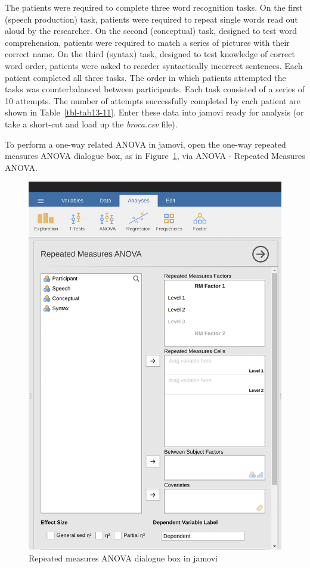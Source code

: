 \documentclass[
  a4paper,
]{book}
\begin{document}
The patients were required to complete three word recognition tasks. On
the first (speech production) task, patients were required to repeat
single words read out aloud by the researcher. On the second
(conceptual) task, designed to test word comprehension, patients were
required to match a series of pictures with their correct name. On the
third (syntax) task, designed to test knowledge of correct word order,
patients were asked to reorder syntactically incorrect sentences. Each
patient completed all three tasks. The order in which patients attempted
the tasks was counterbalanced between participants. Each task consisted
of a series of 10 attempts. The number of attempts successfully
completed by each patient are shown in Table~\ref{tbl-tab13-11}. Enter
these data into jamovi ready for analysis (or take a short-cut and load
up the \emph{broca.csv} file).

To perform a one-way related ANOVA in jamovi, open the one-way repeated
measures ANOVA dialogue box, as in Figure~\ref{fig-fig13-9}, via ANOVA -
Repeated Measures ANOVA.

\begin{figure}

\includegraphics[width=1\textwidth,height=\textheight]{images/fig13-9.png} \hfill{}

\caption{\label{fig-fig13-9}Repeated measures ANOVA dialogue box in
jamovi}

\end{figure}
\end{document}
